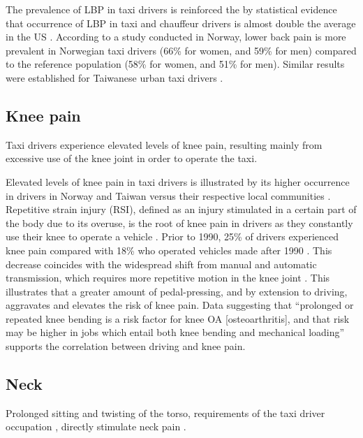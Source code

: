 \documentclass[11pt]{article}
\begin{document}
The prevalence of LBP in taxi drivers is reinforced the by statistical evidence that occurrence of LBP 
in taxi and chauffeur drivers is almost double the average in the US \cite{68}. According to a study conducted in Norway, lower 
back pain is more prevalent in Norwegian taxi drivers (66\% for women, and 59\% for men) 
compared to the reference population (58\% for women, and 51\% for men). Similar results 
were established for Taiwanese urban taxi drivers \cite{Question?}.

 
\subsection{Knee pain}
Taxi drivers experience elevated levels of knee pain, resulting mainly from excessive use 
of the knee joint in order to operate the taxi. 

Elevated levels of knee pain in taxi drivers is illustrated by its higher occurrence in drivers 
in Norway and Taiwan versus their respective local communities \cite{KneePain}. Repetitive strain 
injury (RSI), defined as an injury stimulated in a certain part of the body due to its overuse, is the 
root of knee pain in drivers \cite{RSI} as they constantly use their knee to operate a vehicle 
\cite{KneePain}. Prior to 1990, 25\% of drivers experienced knee pain compared with 18\% who 
operated vehicles made after 1990 \cite{KneePain}. This decrease coincides with the widespread shift from 
manual and automatic transmission, which requires more repetitive motion in the knee joint 
\cite{KneePain}. This illustrates that a greater amount of pedal-pressing, and by extension to 
driving, aggravates and elevates the risk of knee pain. Data suggesting that “prolonged or repeated 
knee bending is a risk factor for knee OA [osteoarthritis], and that risk may be higher in jobs which 
entail both knee bending and mechanical loading” \cite{Osteoarthritis} supports the correlation 
between driving and knee pain.



\subsection{Neck}
Prolonged sitting and twisting of the torso, requirements of the taxi driver occupation \cite{neck}, 
directly stimulate neck pain \cite{neck}. 
\end{document}
